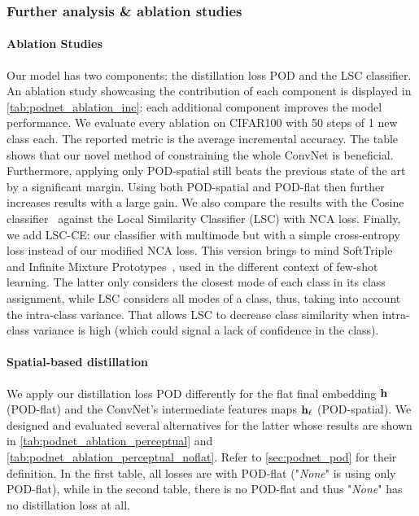 



\subsubsection{Further analysis \& ablation studies}
\label{sec:podnet_ablation}

\paragraph{Ablation Studies}
Our model has two components: the distillation loss \ac{POD} and the \ac{LSC} classifier. An ablation study
showcasing the contribution of each component is displayed in \autoref{tab:podnet_ablation_inc}: each
additional component improves the model performance. We evaluate every ablation on CIFAR100 with 50
steps of 1 new class each. The reported metric is the average incremental accuracy. The table shows
that our novel method of constraining the whole \ac{ConvNet} is beneficial. Furthermore, applying only
POD-spatial still beats the previous state of the art by a significant margin. Using both
POD-spatial and POD-flat then further increases results with a large gain. We also compare the
results with the Cosine classifier~\citep{luo2018cosine_classifier,hou2019ucir} against the Local
Similarity Classifier (LSC) with NCA loss. Finally, we add LSC-CE: our classifier with multimode
but with a simple cross-entropy loss instead of our modified NCA loss. This version brings to mind
SoftTriple~\citep{qian2019softtriple} and Infinite Mixture
Prototypes~\citep{allen2019infinitemixtureproto}, used in the different context of few-shot
learning.
The latter only considers the closest mode of each class in its class assignment, while \ac{LSC}
considers all modes of a class, thus, taking into account the intra-class variance. That allows \ac{LSC}
to decrease class similarity when intra-class variance is high (which could signal a lack of
confidence in the class).

\label{sec:podnet_ablation_pooling}
\paragraph{Spatial-based distillation} We apply our distillation loss \ac{POD} differently for the flat
final embedding $\mathbf{h}$ (POD-flat) and the \ac{ConvNet}'s intermediate features maps $\mathbf{h}_\ell$
(POD-spatial). We designed and evaluated several alternatives for the latter whose results are shown
in \autoref{tab:podnet_ablation_perceptual} and \autoref{tab:podnet_ablation_perceptual_noflat}. Refer to \autoref{sec:podnet_pod}
for their definition. In the first table, all losses are with POD-flat ("\textit{None}" is using only
POD-flat), while in the second table, there is no POD-flat and thus "\textit{None}" has no
distillation loss at all.


